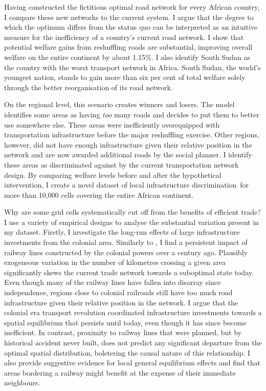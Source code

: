 \documentclass[11pt, oneside]{article}   	%
\begin{document}
Having constructed the fictitious optimal road network for every African country, I compare these new networks to the current system. I argue that the degree to which the optimum differs from the status quo can be interpreted as an intuitive measure for the inefficiency of a country's current road network. I show that potential welfare gains from reshuffling roads are substantial, improving overall welfare on the entire continent by about 1.15\%. I also identify South Sudan as the country with the worst transport network in Africa. South Sudan, the world's youngest nation, stands to gain more than six per cent of total welfare solely through the better reorganisation of its road network.

On the regional level, this scenario creates winners and losers. The model identifies some areas as having \emph{too} many roads and decides to put them to better use somewhere else. These areas were inefficiently overequipped with transportation infrastructure before the major reshuffling exercise. Other regions, however, did not have enough infrastructure given their relative position in the network and are now awarded additional roads by the social planner. I identify these areas as discriminated against by the current transportation network design. By comparing welfare levels before and after the hypothetical intervention, I create a novel dataset of local infrastructure discrimination for more than 10,000 cells covering the entire African continent.

Why are some grid cells systematically cut off from the benefits of efficient trade? I use a variety of empirical designs to analyse the substantial variation present in my dataset. Firstly, I investigate the long-run effects of large infrastructure investments from the colonial area. Similarly to \cite{jedwab_permanent_2016}, I find a persistent impact of railway lines constructed by the colonial powers over a century ago. Plausibly exogeneous variation in the number of kilometres crossing a given area significantly skews the current trade network towards a suboptimal state today. Even though many of the railway lines have fallen into disarray since independence, regions close to colonial railroads still have too much road infrastructure given their relative position in the network. I argue that the colonial era transport revolution coordinated infrastructure investments towards a spatial equilibrium that persists until today, even though it has since become inefficient. In contrast, proximity to railway lines that were planned, but by historical accident never built, does not predict any significant departure from the optimal spatial distribution, bolstering the causal nature of this relationship. I also provide suggestive evidence for local general equilibrium effects and find that areas bordering a railway might benefit at the expense of their immediate neighbours.
\end{document}
